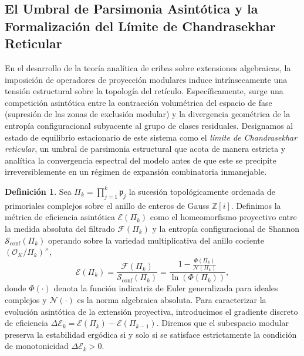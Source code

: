 \documentclass{article}
\numberwithin{equation}{section}
\theoremstyle{plain}
\theoremstyle{definition}
\newtheorem{definicion}[teorema]{Definición}
\begin{document}
\subsection{El Umbral de Parsimonia Asintótica y la Formalización del Límite de Chandrasekhar Reticular}

En el desarrollo de la teoría analítica de cribas sobre extensiones algebraicas, la imposición de operadores de proyección modulares induce intrínsecamente una tensión estructural sobre la topología del retículo. Específicamente, surge una competición asintótica entre la contracción volumétrica del espacio de fase (supresión de las zonas de exclusión modular) y la divergencia geométrica de la entropía configuracional subyacente al grupo de clases residuales.
Designamos al estado de equilibrio estacionario de este sistema como el \textit{límite de Chandrasekhar reticular}, un umbral de parsimonia estructural que acota de manera estricta y analítica la convergencia espectral del modelo antes de que este se precipite irreversiblemente en un régimen de expansión combinatoria inmanejable.

\begin{definicion}
Sea $\Pi_k = \prod_{j=1}^k \mathfrak{p}_j$ la sucesión topológicamente ordenada de primoriales complejos sobre el anillo de enteros de Gauss $\mathbb{Z}[i]$. Definimos la métrica de eficiencia asintótica $\mathcal{E}(\Pi_k)$ como el homeomorfismo proyectivo entre la medida absoluta del filtrado $\mathcal{F}(\Pi_k)$ y la entropía configuracional de Shannon $\mathcal{S}_{\mathrm{conf}}(\Pi_k)$ operando sobre la variedad multiplicativa del anillo cociente $(\mathcal{O}_K/\Pi_k)^\times$,
\begin{equation}
    \mathcal{E}(\Pi_k) = \frac{\mathcal{F}(\Pi_k)}{\mathcal{S}_{\mathrm{conf}}(\Pi_k)} = \frac{1 - \frac{\Phi(\Pi_k)}{\mathcal{N}(\Pi_k)}}{\ln(\Phi(\Pi_k))},
\end{equation}
donde $\Phi(\cdot)$ denota la función indicatriz de Euler generalizada para ideales complejos y $\mathcal{N}(\cdot)$ es la norma algebraica absoluta. 
Para caracterizar la evolución asintótica de la extensión proyectiva, introducimos el gradiente discreto de eficiencia $\Delta \mathcal{E}_k = \mathcal{E}(\Pi_{k}) - \mathcal{E}(\Pi_{k-1})$. Diremos que el subespacio modular preserva la estabilidad ergódica si y solo si se satisface estrictamente la condición de monotonicidad $\Delta \mathcal{E}_k > 0$.
\end{definicion}
\end{document}
